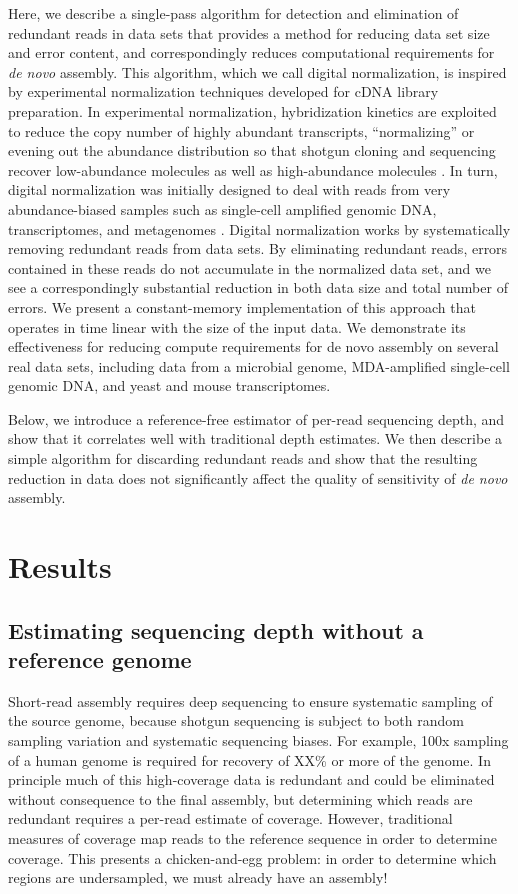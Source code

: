 \documentclass[10pt]{article}
\begin{document}
Here, we describe a single-pass algorithm for detection and
elimination of redundant reads in data sets that provides a method for
reducing data set size and error content, and correspondingly reduces
computational requirements for {\em de novo} assembly.  This algorithm,
which we call digital normalization, is inspired by experimental
normalization techniques developed for cDNA library preparation.  In
experimental normalization, hybridization kinetics are exploited to
reduce the copy number of highly abundant transcripts, ``normalizing''
or evening out the abundance distribution so that shotgun cloning and
sequencing recover low-abundance molecules as well as high-abundance
molecules \cite{pubmed8889548,pubmed7937745}.  In turn, digital
normalization was initially designed to deal with reads from very
abundance-biased samples such as single-cell amplified genomic DNA,
transcriptomes, and metagenomes \cite{pubmed16732271,pubmed19015660,pubmed16304596}.  Digital normalization works by
systematically removing redundant reads from data sets.  By
eliminating redundant reads, errors contained in these reads do not
accumulate in the normalized data set, and we see a correspondingly
substantial reduction in both data size and total number of errors.
We present a constant-memory implementation of this approach that
operates in time linear with the size of the input data.  We
demonstrate its effectiveness for reducing compute requirements for de
novo assembly on several real data sets, including data from a
microbial genome, MDA-amplified single-cell genomic DNA, and yeast and mouse
transcriptomes.

Below, we introduce a reference-free estimator of per-read sequencing
depth, and show that it correlates well with traditional depth estimates.
We then describe a simple algorithm for discarding redundant reads and
show that the resulting reduction in data does not significantly affect
the quality of sensitivity of {\em de novo} assembly.

\section*{Results}

\subsection*{Estimating sequencing depth without a reference genome}

Short-read assembly requires deep sequencing to ensure systematic
sampling of the source genome, because shotgun sequencing is subject
to both random sampling variation and systematic sequencing biases.
For example, 100x sampling of a human genome is required for recovery
of XX\% or more of the genome.  In principle much of this
high-coverage data is redundant and could be eliminated without
consequence to the final assembly, but determining which reads are
redundant requires a per-read estimate of coverage.  However,
traditional measures of coverage map reads to the reference sequence
in order to determine coverage.  This presents a chicken-and-egg
problem: in order to determine which regions are undersampled, we must
already have an assembly!
\end{document}
